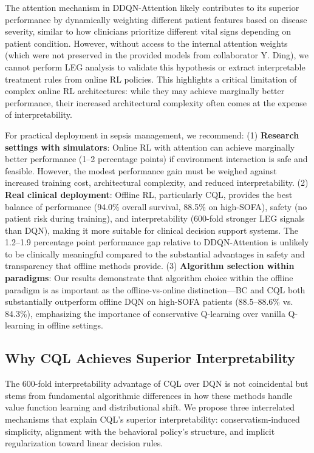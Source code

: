 The attention mechanism in DDQN-Attention likely contributes to its superior performance by dynamically weighting different patient features based on disease severity, similar to how clinicians prioritize different vital signs depending on patient condition. However, without access to the internal attention weights (which were not preserved in the provided models from collaborator Y. Ding), we cannot perform LEG analysis to validate this hypothesis or extract interpretable treatment rules from online RL policies. This highlights a critical limitation of complex online RL architectures: while they may achieve marginally better performance, their increased architectural complexity often comes at the expense of interpretability.

For practical deployment in sepsis management, we recommend: (1) \textbf{Research settings with simulators}: Online RL with attention can achieve marginally better performance (1--2 percentage points) if environment interaction is safe and feasible. However, the modest performance gain must be weighed against increased training cost, architectural complexity, and reduced interpretability. (2) \textbf{Real clinical deployment}: Offline RL, particularly CQL, provides the best balance of performance (94.0\% overall survival, 88.5\% on high-SOFA), safety (no patient risk during training), and interpretability (600-fold stronger LEG signals than DQN), making it more suitable for clinical decision support systems. The 1.2--1.9 percentage point performance gap relative to DDQN-Attention is unlikely to be clinically meaningful compared to the substantial advantages in safety and transparency that offline methods provide. (3) \textbf{Algorithm selection within paradigms}: Our results demonstrate that algorithm choice within the offline paradigm is as important as the offline-vs-online distinction—BC and CQL both substantially outperform offline DQN on high-SOFA patients (88.5--88.6\% vs. 84.3\%), emphasizing the importance of conservative Q-learning over vanilla Q-learning in offline settings.


\subsection{Why CQL Achieves Superior Interpretability}\label{sec:discussion:mechanism}

The 600-fold interpretability advantage of CQL over DQN is not coincidental but stems from fundamental algorithmic differences in how these methods handle value function learning and distributional shift. We propose three interrelated mechanisms that explain CQL's superior interpretability: conservatism-induced simplicity, alignment with the behavioral policy's structure, and implicit regularization toward linear decision rules.

